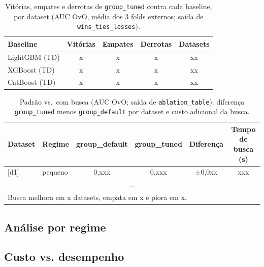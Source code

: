 \documentclass[11pt,a4paper]{article}
\begin{document}
\begin{table}[h]
\centering
\caption{Vitórias, empates e derrotas de \texttt{group\_tuned} contra cada baseline, por dataset (AUC OvO, média dos 3 folds externos; saída de \texttt{wins\_ties\_losses}).}
\label{tab:vel}
\footnotesize
\begin{tabular}{l c c c c}
\toprule
\textbf{Baseline} & \textbf{Vitórias} & \textbf{Empates} & \textbf{Derrotas} & \textbf{Datasets} \\
\midrule
LightGBM (TD) & x & x & x & xx \\
XGBoost (TD)  & x & x & x & xx \\
CatBoost (TD) & x & x & x & xx \\
\bottomrule
\end{tabular}
\end{table}

\begin{table}[h]
\centering
\caption{Padrão vs.\ com busca (AUC OvO; saída de \texttt{ablation\_table}): diferença \texttt{group\_tuned} menos \texttt{group\_default} por dataset e custo adicional da busca.}
\label{tab:ablacao}
\footnotesize
\begin{tabular}{l l c c c c}
\toprule
\textbf{Dataset} & \textbf{Regime} & \textbf{group\_default} & \textbf{group\_tuned} & \textbf{Diferença} & \textbf{Tempo de busca (s)} \\
\midrule
{}[d1] & pequeno & 0,xxx & 0,xxx & $\pm$0,0xx & xxx \\
\multicolumn{6}{c}{...} \\
\midrule
\multicolumn{6}{l}{Busca melhora em x datasets, empata em x e piora em x.} \\
\bottomrule
\end{tabular}
\end{table}

\subsection{Análise por regime}

\subsection{Custo vs. desempenho}
\end{document}

